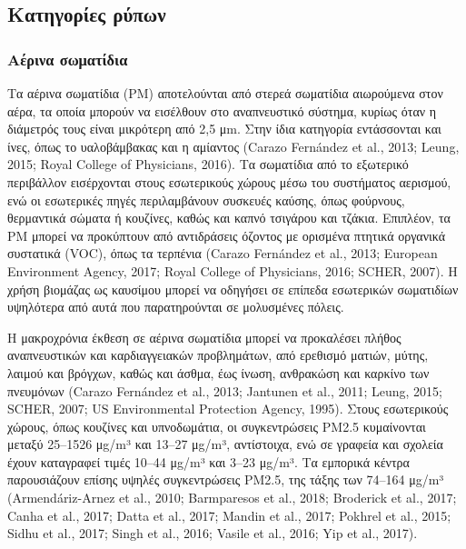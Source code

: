 \subsection{Κατηγορίες ρύπων}


\subsubsection{Αέρινα σωματίδια}



Τα αέρινα σωματίδια (PM) αποτελούνται από στερεά σωματίδια αιωρούμενα στον αέρα, τα οποία μπορούν να εισέλθουν στο αναπνευστικό σύστημα, κυρίως όταν η διάμετρός τους είναι μικρότερη από 2,5 μm. Στην ίδια κατηγορία εντάσσονται και ίνες, όπως το υαλοβάμβακας και η αμίαντος (Carazo Fernández et al., 2013; Leung, 2015; Royal College of Physicians, 2016). Τα σωματίδια από το εξωτερικό περιβάλλον εισέρχονται στους εσωτερικούς χώρους μέσω του συστήματος αερισμού, ενώ οι εσωτερικές πηγές περιλαμβάνουν συσκευές καύσης, όπως φούρνους, θερμαντικά σώματα ή κουζίνες, καθώς και καπνό τσιγάρου και τζάκια. Επιπλέον, τα PM μπορεί να προκύπτουν από αντιδράσεις όζοντος με ορισμένα πτητικά οργανικά συστατικά (VOC), όπως τα τερπένια (Carazo Fernández et al., 2013; European Environment Agency, 2017; Royal College of Physicians, 2016; SCHER, 2007). Η χρήση βιομάζας ως καυσίμου μπορεί να οδηγήσει σε επίπεδα εσωτερικών σωματιδίων υψηλότερα από αυτά που παρατηρούνται σε μολυσμένες πόλεις.

Η μακροχρόνια έκθεση σε αέρινα σωματίδια μπορεί να προκαλέσει πλήθος αναπνευστικών και καρδιαγγειακών προβλημάτων, από ερεθισμό ματιών, μύτης, λαιμού και βρόγχων, καθώς και άσθμα, έως ίνωση, ανθρακώση και καρκίνο των πνευμόνων (Carazo Fernández et al., 2013; Jantunen et al., 2011; Leung, 2015; SCHER, 2007; US Environmental Protection Agency, 1995). Στους εσωτερικούς χώρους, όπως κουζίνες και υπνοδωμάτια, οι συγκεντρώσεις PM2.5 κυμαίνονται μεταξύ 25–1526 μg/m³ και 13–27 μg/m³, αντίστοιχα, ενώ σε γραφεία και σχολεία έχουν καταγραφεί τιμές 10–44 μg/m³ και 3–23 μg/m³. Τα εμπορικά κέντρα παρουσιάζουν επίσης υψηλές συγκεντρώσεις PM2.5, της τάξης των 74–164 μg/m³ (Armendáriz-Arnez et al., 2010; Barmparesos et al., 2018; Broderick et al., 2017; Canha et al., 2017; Datta et al., 2017; Mandin et al., 2017; Pokhrel et al., 2015; Sidhu et al., 2017; Singh et al., 2016; Vasile et al., 2016; Yip et al., 2017).

